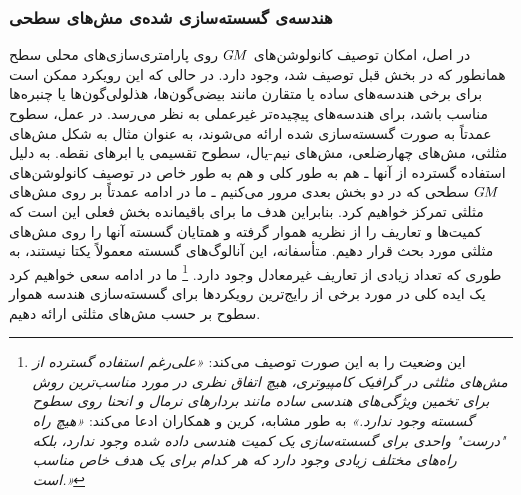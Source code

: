 \subsubsection{هندسه‌ی گسسته‌سازی شده‌ی مش‌های سطحی}
\label{sec:surfaces_geom_mesh}

در اصل، امکان توصیف کانولوشن‌های $G\mkern-1.4muM$ روی پارامتری‌سازی‌های محلی سطح همانطور که در بخش قبل توصیف شد، وجود دارد.
در حالی که این رویکرد ممکن است برای برخی هندسه‌های ساده یا متقارن مانند بیضی‌گون‌ها، هذلولی‌گون‌ها یا چنبره‌ها مناسب باشد، برای هندسه‌های پیچیده‌تر غیرعملی به نظر می‌رسد.
در عمل، سطوح عمدتاً به صورت گسسته‌سازی شده ارائه می‌شوند، به عنوان مثال به شکل مش‌های مثلثی، مش‌های چهارضلعی، مش‌های نیم-یال، سطوح تقسیمی یا ابرهای نقطه.
به دلیل استفاده گسترده از آنها ـ هم به طور کلی و هم به طور خاص در توصیف کانولوشن‌های $G\mkern-1.4muM$ سطحی که در دو بخش بعدی مرور می‌کنیم ـ ما در ادامه عمدتاً بر روی مش‌های مثلثی تمرکز خواهیم کرد.
بنابراین هدف ما برای باقیمانده بخش فعلی این است که کمیت‌ها و تعاریف را از نظریه هموار گرفته و همتایان گسسته آنها را روی مش‌های مثلثی مورد بحث قرار دهیم.
متأسفانه، این آنالوگ‌های گسسته معمولاً یکتا نیستند، به طوری که تعداد زیادی از تعاریف غیرمعادل وجود دارد.%
\footnote{
    \cite{meyer2003discrete} این وضعیت را به این صورت توصیف می‌کند:
    \emph{«علی‌رغم استفاده گسترده از مش‌های مثلثی در گرافیک کامپیوتری، هیچ اتفاق نظری در مورد مناسب‌ترین روش برای تخمین ویژگی‌های هندسی ساده مانند بردارهای نرمال و انحنا روی سطوح گسسته وجود ندارد.»}
    به طور مشابه، کرین و همکاران\cite{craneDiscreteDifferentialGeometry2014} ادعا می‌کند:
    \emph{«هیچ راه "درست" واحدی برای گسسته‌سازی یک کمیت هندسی داده شده وجود ندارد، بلکه راه‌های مختلف زیادی وجود دارد که هر کدام برای یک هدف خاص مناسب است.»}
 	}
ما در ادامه سعی خواهیم کرد یک ایده کلی در مورد برخی از رایج‌ترین رویکردها برای گسسته‌سازی هندسه هموار سطوح بر حسب مش‌های مثلثی ارائه دهیم.


